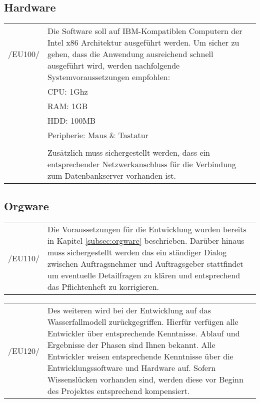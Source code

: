 \subsection{Hardware}
\label{subsec:devhardware}

\begin{tabular}{p{1.5cm}p{14.5cm}}

	 /EU100/ & Die Software soll auf IBM-Kompatiblen Computern der Intel x86 Architektur ausgeführt werden.
Um sicher zu gehen, dass die Anwendung ausreichend schnell ausgeführt wird, werden nachfolgende Systemvoraussetzungen empfohlen:\\

	&CPU: 1Ghz\\
	&RAM: 1GB\\
	&HDD: 100MB\\
	&Peripherie: Maus \& Tastatur\\
	&\\
	&Zusätzlich muss sichergestellt werden, dass ein entsprechender Netzwerkanschluss für die Verbindung zum Datenbankserver vorhanden ist.\\[0.25cm]

\end{tabular}

\subsection{Orgware}
\label{subsec:devorgware}

\begin{tabular}{p{1.5cm}p{14.5cm}}

	 /EU110/	&  Die Voraussetzungen für die Entwicklung wurden bereits in Kapitel \ref{subsec:orgware} beschrieben.
Darüber hinaus muss sichergestellt werden das ein ständiger Dialog zwischen Auftragsnehmer und Auftragsgeber stattfindet um eventuelle Detailfragen zu klären und entsprechend das Pflichtenheft zu korrigieren.\\[0.25cm]

\end{tabular}

\begin{tabular}{p{1.5cm}p{14.5cm}}

	 /EU120/	&  Des weiteren wird bei der Entwicklung auf das Wasserfallmodell zurückgegriffen. Hierfür verfügen alle Entwickler über entsprechende Kenntnisse. Ablauf und Ergebnisse der Phasen sind Ihnen bekannt. Alle Entwickler weisen entsprechende Kenntnisse über die Entwicklungssoftware und Hardware auf. Sofern Wissenslücken vorhanden sind, werden diese vor Beginn des Projektes entsprechend kompensiert.\\[0.25cm]

\end{tabular}






